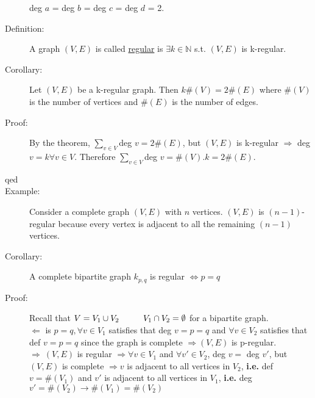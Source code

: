 \documentclass[10pt]{article}
\begin{document}
\begin{description}
\begin{figure}[h!]
		\end{figure}
		deg $a$ = deg $b$ = deg $c$ = deg $d$ = 2.
		\item[Definition:] A graph $(V, E)$ is called \underline{regular} is $\exists k \in \mathbb{N}$ s.t. $(V, E)$ is k-regular.
		\item[Corollary:] Let $(V, E)$ be a k-regular graph. Then $k\#(V) = 2\#(E)$ where $\#(V)$ is the number of vertices and $\#(E)$ is the number of edges.
		\item[Proof:] By the theorem, $\sum_{v \in V}$deg $v = 2\#(E)$, but $(V, E)$ is k-regular $\Rightarrow$ deg $v = k \forall v \in V$. Therefore $\sum_{v \in V}$deg $v = \#(V).k = 2 \#(E)$.
		\item[qed]
		\item[Example:] Consider a complete graph $(V, E)$ with $n$ vertices. $(V, E)$ is $(n-1)$-regular because every vertex is adjacent to all the remaining $(n-1)$ vertices.
		\item[Corollary:] A complete bipartite graph $k_{p,q}$ is regular $\Leftrightarrow p = q$
		\item[Proof:] Recall that $V=V_1 \cup V_2 \hspace{10mm} V_1 \cap V_2 = \emptyset$ for a bipartite graph. \\
		$\Leftarrow$ is $p=q, \forall v \in V_1$ satisfies that deg $v = p = q$ and $\forall v \in V_2$ satisfies that def $v=p=q$ since the graph is complete $\Rightarrow (V, E)$ is p-regular. \\
		$\Rightarrow \: (V, E)$ is regular $\Rightarrow \forall v \in V_1$ and $\forall v' \in V_2$, deg $v=$ deg $v'$, but $(V, E)$ is complete $\Rightarrow v$ is adjacent to all vertices in $V_2$, \textbf{i.e.} def $v = \#(V_1)$ and $v'$ is adjacent to all vertices in $V_1$, \textbf{i.e.} deg $v' = \#(V_2) \rightarrow \#(V_1) = \#(V_2)$
	\end{description}
	
\end{document}
